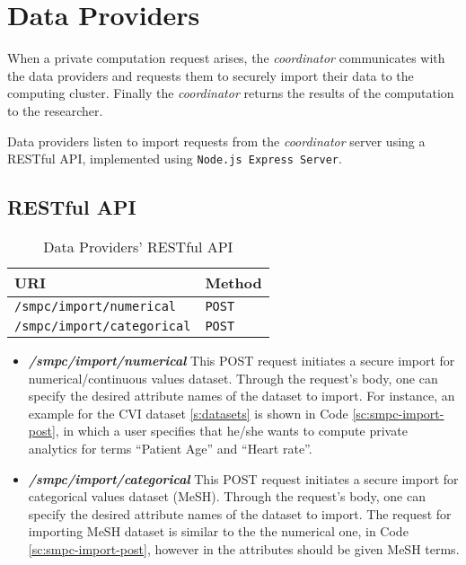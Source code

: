 
\section{Data Providers}\label{s:impl-data-providers}
When a private computation request arises, the \textit{coordinator} communicates with the data providers and requests them to securely import their data to the computing cluster.
Finally the \textit{coordinator} returns the results of the computation to the researcher.

Data providers listen to import requests from the \textit{coordinator} server using a RESTful API, implemented using \texttt{Node.js Express Server}.

\subsection{RESTful API}\label{ss:data-providers-restful-api}

\begin{table}[H]
\centering
\caption{Data Providers' RESTful API}
\label{t:data-providers-api}
\begin{tabular}{@{}ll@{}}
\toprule
URI                                & Method        \\ \midrule
\texttt{/smpc/import/numerical}    & \texttt{POST} \\
\texttt{/smpc/import/categorical}  & \texttt{POST} \\ \bottomrule
\end{tabular}
\end{table}


\begin{itemize}
\item \textbf{\textit{/smpc/import/numerical}}
This POST request initiates a secure import for numerical/continuous values dataset.
Through the request's body, one can specify the desired attribute names of the dataset to import.
For instance, an example for the CVI dataset \ref{s:datasets} is shown in Code \ref{sc:smpc-import-post}, in which a user specifies that he/she wants to compute private analytics for terms ``Patient Age'' and ``Heart rate''.

\item \textbf{\textit{/smpc/import/categorical}}
This POST request initiates a secure import for categorical values dataset (MeSH).
Through the request's body, one can specify the desired attribute names of the dataset to import.
The request for importing MeSH dataset is similar to the the numerical one, in Code \ref{sc:smpc-import-post}, however in the attributes should be given MeSH terms.

\end{itemize}

